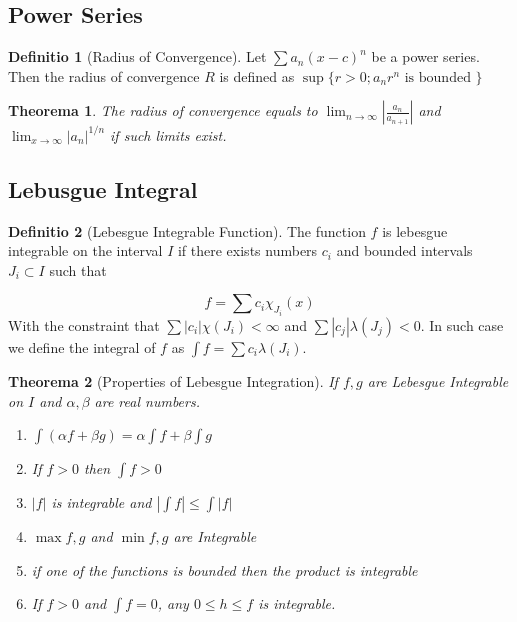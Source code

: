 \documentclass[12pt, a4paper]{article}
\newtheorem{theorem}{Theorema}
\theoremstyle{definition}
\newtheorem{definition}{Definitio}
\theoremstyle{remark}
\begin{document}
\subsection{Power Series} 

\begin{definition}[Radius of Convergence]
	Let $\sum a_n (x-c)^n$ be a power series. Then the radius of convergence $R$ is defined as $\sup \{r>0; a_nr^n \text{ is bounded }\}$
	
\end{definition}

\begin{theorem}
	The radius of convergence equals to $\lim_{n \rightarrow  \infty} \left| \frac{a_n}{a_{n+1}} \right|$ and $\lim_{x \rightarrow  \infty} |a_n|^{1/n}$ if such limits exist.
\end{theorem}

\subsection{Lebusgue Integral}

\begin{definition}[Lebesgue Integrable Function]
	The function $f$ is lebesgue integrable on the interval $I$ if there exists numbers $c_i$ and bounded intervals $J_i \subset I$ such that 

	$$
		f = \sum c_i \chi_{J_i}(x)
	$$
	With the constraint that $\sum |c_i| \chi(J_i) < \infty$ and $\sum |c_j| \lambda(J_j) < 0$. In such case we define the integral of $f$ as $\int f = \sum c_i \lambda(J_i)$.
\end{definition}

\begin{theorem}[Properties of Lebesgue Integration]
	If $f, g$ are Lebesgue Integrable on $I$ and $\alpha, \beta$ are real numbers. 
	\begin{enumerate}
		\item $\int (\alpha f + \beta g) = \alpha \int f + \beta \int g$
		\item If $f >0$ then $\int f > 0$
		\item $|f|$ is integrable and $|\int f| \leq \int |f|$
		\item $\max{f,g}$ and $\min{f,g}$ are Integrable 
		\item if one of the functions is bounded then the product is integrable
		\item If $f>0$ and $\int f = 0$, any $0 \leq h \leq f$ is integrable.  
	\end{enumerate}
\end{theorem}
\end{document}

